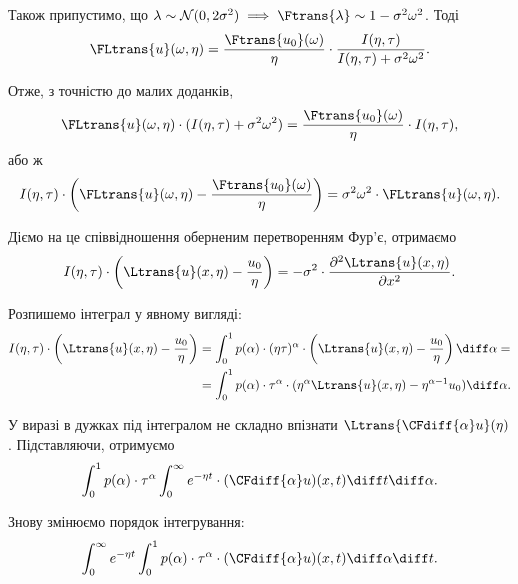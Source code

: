 Також припустимо, що $\lambda \sim \mathcal{N}(0, 2 \sigma^2) \implies \Ftrans{\lambda} \sim 1 - \sigma^2 \omega^2$. Тоді
\begin{equation}
    \FLtrans{u}(\omega, \eta)
    = \frac{\Ftrans{u_0}(\omega)}{\eta} \cdot \frac{I(\eta, \tau)}{I(\eta, \tau) + \sigma^2 \omega^2}.
\end{equation}

Отже, з точністю до малих доданків,
\begin{equation}
    \FLtrans{u}(\omega, \eta) \cdot ( I(\eta, \tau) + \sigma^2 \omega^2 ) = \frac{\Ftrans{u_0}(\omega)}{\eta} \cdot I(\eta, \tau),
\end{equation}
або ж
\begin{equation}
    I(\eta, \tau) \cdot \left( \FLtrans{u}(\omega, \eta) - \frac{\Ftrans{u_0}(\omega)}{\eta} \right) = \sigma^2 \omega^2 \cdot \FLtrans{u}(\omega, \eta).
\end{equation}

Діємо на це співвідношення оберненим перетворенням Фур'є, отримаємо
\begin{equation}
    I(\eta, \tau) \cdot \left( \Ltrans{u}(x, \eta) - \frac{u_0}{\eta} \right) = -\sigma^2 \cdot \frac{\partial^2 \Ltrans{u}(x, \eta)}{\partial x^2}.
\end{equation}

Розпишемо інтеграл у явному вигляді:
\begin{equation}
    \begin{aligned}
        I(\eta, \tau) \cdot \left( \Ltrans{u}(x, \eta) - \frac{u_0}{\eta} \right)
        &= \int_0^1 p(\alpha) \cdot (\eta \tau)^\alpha \cdot \left( \Ltrans{u}(x, \eta) - \frac{u_0}{\eta} \right) \diff \alpha = \\
        &= \int_0^1 p(\alpha) \cdot \tau^\alpha \cdot (\eta^\alpha \Ltrans{u}(x, \eta) - \eta^{\alpha - 1} u_0) \diff \alpha.
    \end{aligned}
\end{equation}

У виразі в дужках під інтегралом не складно впізнати $\Ltrans{\CFdiff{\alpha} u}(\eta)$. Підставляючи, отримуємо
\begin{equation}
    \int_0^1 p(\alpha) \cdot \tau^\alpha \int_0^\infty e^{-\eta t} \cdot (\CFdiff{\alpha} u) (x, t) \diff t \diff \alpha.
\end{equation}

Знову змінюємо порядок інтегрування:
\begin{equation}
    \int_0^\infty e^{-\eta t} \int_0^1 p(\alpha) \cdot \tau^\alpha \cdot (\CFdiff{\alpha} u)(x, t) \diff \alpha \diff t.
\end{equation}

